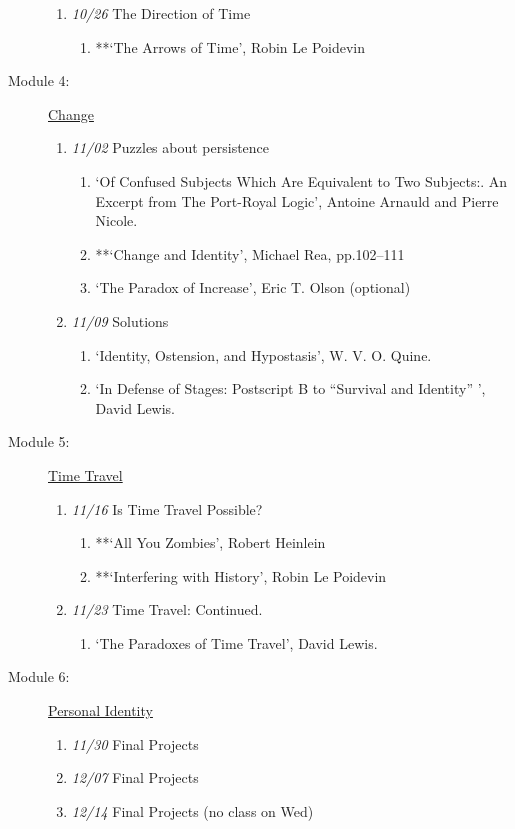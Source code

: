 \documentclass[article,oneside]{memoir}
\begin{document}
\begin{description}
\begin{enumerate}
\item \textit{10/26} The Direction of Time
\begin{enumerate}
\item **`The Arrows of Time', Robin Le Poidevin 
\end{enumerate}
\end{enumerate}
\item[Module 4:] \href{http://scoconno.github.io/Teaching/Metaphysics/Change}{Change}
\begin{enumerate}
\item \textit{11/02} Puzzles about persistence
\begin{enumerate}
\item `Of Confused Subjects Which Are Equivalent to Two Subjects:. An Excerpt from The Port-Royal Logic', Antoine Arnauld and Pierre Nicole. 
\item **`Change and Identity', Michael Rea, pp.102--111 
\item `The Paradox of Increase', Eric T. Olson (optional)
\end{enumerate}
\item \textit{11/09} Solutions
\begin{enumerate}
 \item `Identity, Ostension, and Hypostasis', W. V. O. Quine.
\item `In Defense of Stages: Postscript B to ``Survival and Identity'' ', David Lewis.
\end{enumerate}
\end{enumerate}
\item[Module 5:] \href{http://scoconno.github.io/Teaching/Metaphysics/TT}{Time Travel}
\begin{enumerate}
\item \textit{11/16} Is Time Travel Possible?
\begin{enumerate}
\item **`All You Zombies', Robert Heinlein 
\item **`Interfering with History', Robin Le Poidevin 
\end{enumerate}
\item \textit{11/23} Time Travel: Continued.
\begin{enumerate}
\item `The Paradoxes of Time Travel', David Lewis.
\end{enumerate}
\end{enumerate}
\item[Module 6:] \href{http://scoconno.github.io/Teaching/Metaphysics/Personal}{Personal Identity}
\begin{enumerate}
\item \textit{11/30} Final Projects
\item \textit{12/07} Final Projects
\item \textit{12/14} Final  Projects (no class on Wed)
\end{enumerate}
\end{description}
\end{document}
